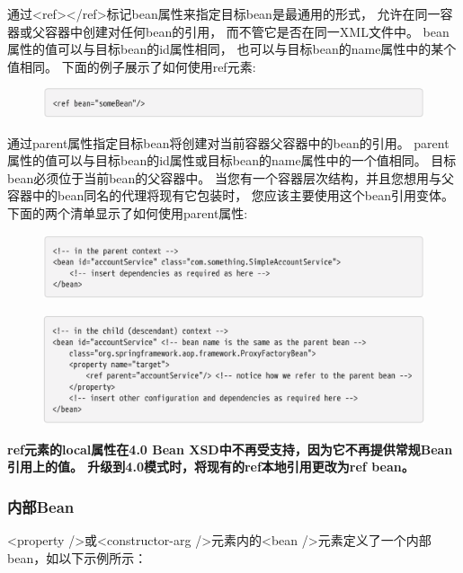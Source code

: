 通过<ref></ref>标记bean属性来指定目标bean是最通用的形式，
允许在同一容器或父容器中创建对任何bean的引用，
而不管它是否在同一XML文件中。
bean属性的值可以与目标bean的id属性相同，
也可以与目标bean的name属性中的某个值相同。
下面的例子展示了如何使用ref元素:

\begin{figure}[ht]
    \centering
    \includegraphics[width=1\linewidth]{./Figure/IMG_code_37.png}
\end{figure}

通过parent属性指定目标bean将创建对当前容器父容器中的bean的引用。
parent属性的值可以与目标bean的id属性或目标bean的name属性中的一个值相同。
目标bean必须位于当前bean的父容器中。
当您有一个容器层次结构，并且您想用与父容器中的bean同名的代理将现有它包装时，
您应该主要使用这个bean引用变体。下面的两个清单显示了如何使用parent属性:

\begin{figure}[ht]
    \centering
    \includegraphics[width=1\linewidth]{./Figure/IMG_code_38.png}
\end{figure}

\newpage
\begin{figure}[ht]
    \centering
    \includegraphics[width=1\linewidth]{./Figure/IMG_code_39.png}
\end{figure}


\textbf{ref元素的local属性在4.0 Bean XSD中不再受支持，因为它不再提供常规Bean引用上的值。 升级到4.0模式时，将现有的ref本地引用更改为ref bean。}

\subsubsection{内部Bean}
<property />或<constructor-arg />元素内的<bean />元素定义了一个内部bean，如以下示例所示：

